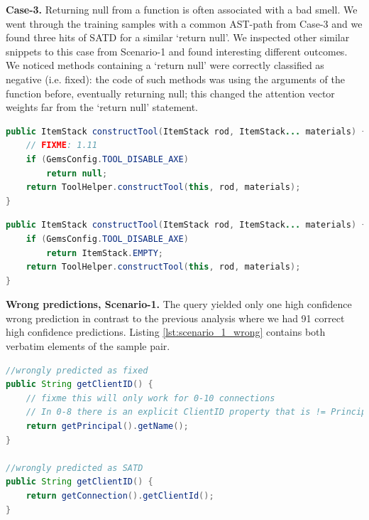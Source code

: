 \textbf{Case-3.} Returning null from a function is often associated with a bad smell. We went through the training samples with a common AST-path from Case-3 and we found three hits of SATD for a similar `return null'. We inspected other similar snippets to this case from Scenario-1 and found interesting different outcomes. We noticed methods containing a `return null' were correctly classified as negative (i.e. fixed): the code of such methods was using the arguments of the function before, eventually returning null; this changed the attention vector weights far from the `return null' statement. 


\begin{lstlisting}[caption={Case-3 SATD, verbatim source code}, label={lst:case3satd},language=Java]
public ItemStack constructTool(ItemStack rod, ItemStack... materials) {
    // FIXME: 1.11
    if (GemsConfig.TOOL_DISABLE_AXE)
        return null;
    return ToolHelper.constructTool(this, rod, materials);
}
\end{lstlisting}

\begin{lstlisting}[caption={Case-3 fixed, verbatim source code}, label={lst:case3fixed},language=Java]
public ItemStack constructTool(ItemStack rod, ItemStack... materials) {
    if (GemsConfig.TOOL_DISABLE_AXE)
        return ItemStack.EMPTY;
    return ToolHelper.constructTool(this, rod, materials);
}
\end{lstlisting}

\textbf{Wrong predictions, Scenario-1.}
The query yielded only one %
high confidence wrong prediction in contrast to the previous analysis where we had 91 correct high confidence predictions. Listing \ref{lst:scenario_1_wrong} contains both verbatim elements of the sample pair.


\begin{lstlisting}[caption={Scenario-1 wrong predictions, verbatim source code}, label={lst:scenario_1_wrong},language=Java]
//wrongly predicted as fixed
public String getClientID() {
    // fixme this will only work for 0-10 connections
    // In 0-8 there is an explicit ClientID property that is != Principal.
    return getPrincipal().getName();
}

//wrongly predicted as SATD
public String getClientID() {
    return getConnection().getClientId();
}
\end{lstlisting}


